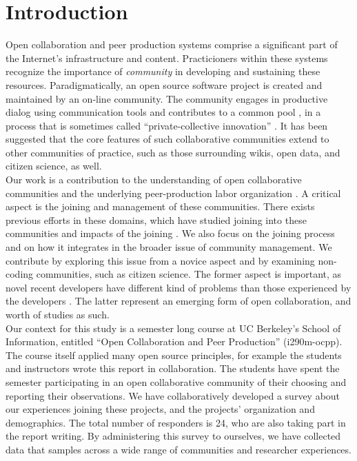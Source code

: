 \section{Introduction}

Open collaboration and peer production systems comprise a significant
part of the Internet's infrastructure and content.
Practicioners within these systems recognize the importance of
\emph{community} \cite{fogel2005producing} in developing and sustaining these resources.
Paradigmatically, an open source software project is created and maintained by an on-line community.
The community engages in productive dialog using communication tools and contributes to
a common pool \cite{ostrom1990}, in a process that is sometimes called ``private-collective innovation'' \cite{vonhippel2003oss}.
It has been suggested that the core features of such collaborative
communities extend to other communities of practice, such as those
surrounding wikis, open data, and citizen science, as well.\\

\noindent Our work is a contribution to the understanding of open collaborative
communities and the underlying peer-production labor organization \cite{benkler2002}.
A critical aspect is the joining and management of these communities. There exists previous efforts in these domains, which have studied joining into these communities and impacts of the joining \cite{vonKrogh2003,Baldwin2006}.
We also focus on the joining process and on how
it integrates in the broader issue of community management.
We contribute by exploring this issue from a novice aspect and by examining non-coding communities, such as citizen science. The former aspect is important, as novel recent developers have different kind of problems than those experienced by the developers \cite{Begel2008}. The latter represent an emerging form of open collaboration, and worth of studies as such.\\

\noindent Our context for this study is a semester long course at UC Berkeley's School of Information, entitled ``Open Collaboration and Peer Production'' (i290m-ocpp). The course itself applied many open source principles, for example
the students and instructors wrote this report in collaboration.
The students have spent the semester participating in an open
collaborative community of their choosing and reporting
their observations. We have collaboratively developed a survey about our experiences joining these projects, and the projects' organization and demographics. The total number of responders is 24, who are also taking part in the report writing.
By administering this survey to ourselves, we have collected data
that samples across a wide range of communities and researcher experiences.


